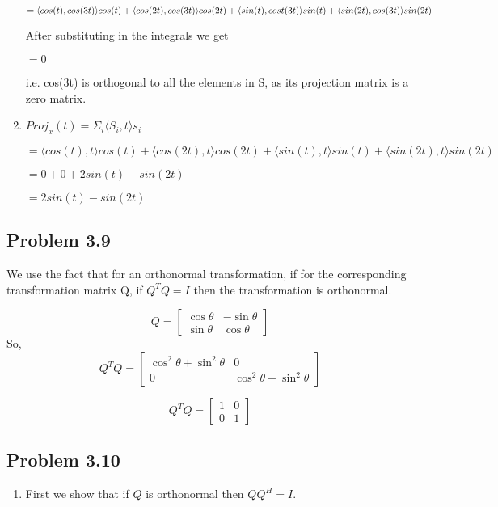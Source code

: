 \documentclass[letterpaper,12pt]{article}
\theoremstyle{definition}
\begin{document}
\begin{spacing}{1.3}{}
\begin{enumerate}
	$= \langle cos(t), cos(3t) \rangle cos(t) + \langle cos(2t), cos(3t) \rangle cos(2t) + \langle sin(t), cost(3t) \rangle sin(t) +\\ \langle sin(2t), cos(3t) \rangle sin(2t)$

	
	After substituting in the integrals we get
	
	$=0$
	
	i.e. cos(3t) is orthogonal to all the elements in S, as its projection matrix is a zero matrix.
	\item
		$Proj_{x}(t) = \Sigma_{i}\langle S_i , t \rangle s_i$
	
	$= \langle cos(t), t \rangle cos(t) + \langle cos(2t), t \rangle cos(2t) + \langle sin(t), t \rangle sin(t) + \langle sin(2t), t \rangle sin(2t)$
	
	$= 0 + 0 + 2sin(t) - sin(2t)$
	
	$=2sin(t) - sin(2t)$
	
\end{enumerate}
	
\subsection*{Problem 3.9}
	
	We use the fact that for an orthonormal transformation, if for the corresponding transformation matrix Q, if  $Q^TQ = I$ then the transformation is orthonormal.  
	
	\[Q=
	\begin{bmatrix}
	\cos \theta & -\sin \theta \\
	\sin \theta & \cos \theta
	\end{bmatrix}
	\]
	So,
	\[Q^{T}Q=
	\begin{bmatrix}
	\cos^{2} \theta + \sin^{2} \theta & 0 \\
	0 & \cos^{2} \theta + \sin^{2} \theta
	\end{bmatrix}
	\]
	
	\[Q^{T}Q=
	\begin{bmatrix}
	1 & 0 \\
	0 & 1
	\end{bmatrix}
	\]
	
\subsection*{Problem 3.10}
\begin{enumerate}
  \item 
  First we show that if $Q$ is orthonormal then $QQ^H = I$.
	

\end{enumerate}
\end{spacing}
\end{document}

